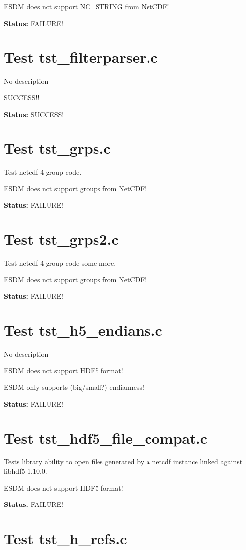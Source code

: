 ESDM does not support NC\_STRING from NetCDF!

{\bf \large Status: } FAILURE!

\section{Test tst\_filterparser.c}

No description.

SUCCESS!!

{\bf \large Status: } SUCCESS!

\section{Test tst\_grps.c}

Test netcdf-4 group code.

ESDM does not support groups from NetCDF!

{\bf \large Status: } FAILURE!

\section{Test tst\_grps2.c}

Test netcdf-4 group code some more.

ESDM does not support groups from NetCDF!

{\bf \large Status: } FAILURE!

\section{Test tst\_h5\_endians.c}

No description.

ESDM does not support HDF5 format!

ESDM only supports (big/small?) endianness!

{\bf \large Status: } FAILURE!

\section{Test tst\_hdf5\_file\_compat.c}

Tests library ability to open files generated by a netcdf instance linked against libhdf5 1.10.0.

ESDM does not support HDF5 format!

{\bf \large Status: } FAILURE!

\section{Test tst\_h\_refs.c}

